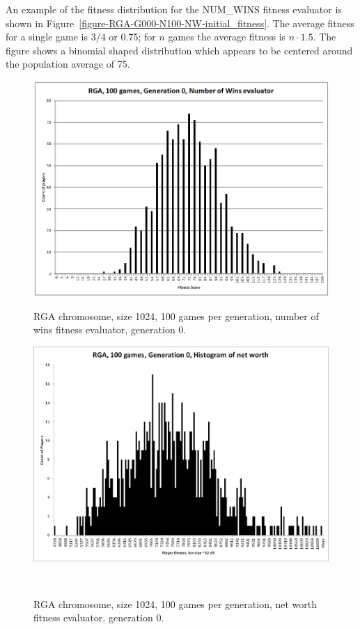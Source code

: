 An example of the fitness distribution for the NUM\_WINS fitness evaluator is
shown in Figure~\ref{figure-RGA-G000-N100-NW-initial_fitness}. The average
fitness for a single game is \(3/4\) or 0.75; for \(n\) games the average
fitness is \(n \cdot 1.5\). The figure shows a binomial shaped distribution
which appears to be centered around the population average of 75.

\begin{figure}
\centering
\begin{minipage}[t]{0.47\linewidth}
\centering
\includegraphics[width=1.0\linewidth]{Figures/RGA_1024_G000_N100_NW.png}
\caption[RGA Num Wins Fitness Distribution, Initial Generation]{RGA chromosome,
size 1024, 100 games per generation, number of wins fitness evaluator,
generation 0.}
\label{figure-RGA-G000-N100-NW-initial_fitness}
\end{minipage}%
\hspace{0.06\linewidth}%
\begin{minipage}[t]{0.47\linewidth}
\centering
\includegraphics[width=1.0\linewidth]{Figures/RGA_1024_G000_N100_NetW.png}
\caption[Historgram of RGA Net Worth Fitness Distribution, Initial
Generation]{RGA chromosome, size 1024, 100 games per generation, net worth
fitness evaluator, generation 0.}
\label{figure-RGA-G000-N100-NetW-initial_fitness}
\end{minipage}
\\[\intextsep]


\end{figure}
